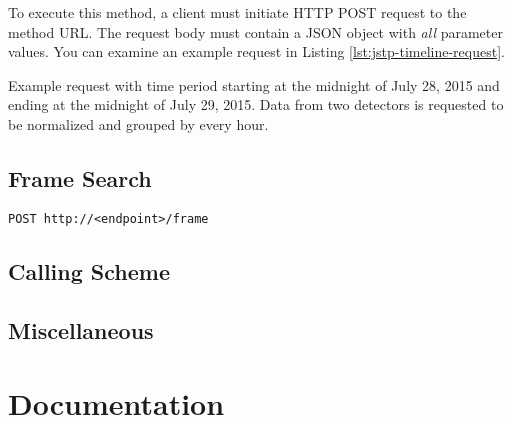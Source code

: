To execute this method, a client must initiate HTTP POST request to the method URL. The request body must contain a JSON object with \textit{all} parameter values. You can examine an example request in Listing \ref{lst:jstp-timeline-request}.

\begin{listing}
    \caption{Example request with time period starting at the midnight of July 28, 2015 and ending at the midnight of July 29, 2015. Data from two detectors is requested to be normalized and grouped by every hour.}
    \label{lst:jstp-timeline-request}
\end{listing}



\subsection{Frame Search}
\hfill
\texttt{POST http://<endpoint>/frame}

\subsection{Calling Scheme}

\subsection{Miscellaneous}

\section{Documentation}

